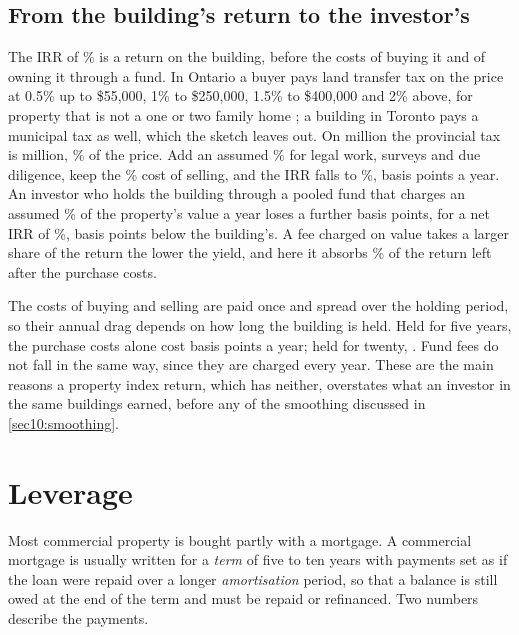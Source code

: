 \begin{chapterrefs}
\subsection{From the building's return to the investor's}
\label{sec10:frictions}

The IRR of \pfIrr\% is a return on the building, before the costs of buying it and of owning it through
a fund. In Ontario a buyer pays land transfer tax on the price at 0.5\% up to \$55,000, 1\% to
\$250,000, 1.5\% to \$400,000 and 2\% above, for property that is not a one or two family home
\parencite{ontarioltt}; a building in Toronto pays a municipal tax as well, which the sketch leaves out.
On \pfValue{} million the provincial tax is \frLtt{} million, \frLttShare\% of the price. Add an assumed
\frClosing\% for legal work, surveys and due diligence, keep the \pfSaleCost\% cost of selling, and the
IRR falls to \frIrrBuy\%, \frDragBuy{} basis points a year. An investor who holds the building through
a pooled fund that charges an assumed \frFee\% of the property's value a year loses a further
\frDragFee{} basis points, for a net IRR of \frIrrNet\%, \frDragAll{} basis points below the
building's. A fee charged on value takes a larger share of the return the lower the yield, and here it
absorbs \frFeeShare\% of the return left after the purchase costs.

The costs of buying and selling are paid once and spread over the holding period, so their annual
drag depends on how long the building is held. Held for five years, the purchase costs alone cost
\frDragBuyFive{} basis points a year; held for twenty, \frDragBuyTwenty. Fund fees do not fall in the
same way, since they are charged every year. These are the main reasons a property index return, which
has neither, overstates what an investor in the same buildings earned, before any of the smoothing
discussed in \cref{sec10:smoothing}.

\FloatBarrier
\section{Leverage}
\label{sec10:leverage}

Most commercial property is bought partly with a mortgage. A commercial mortgage is usually written for
a \emph{term} of five to ten years with payments set as if the loan were repaid over a longer
\emph{amortisation} period, so that a balance is still owed at the end of the term and must be repaid
or refinanced. Two numbers describe the payments.


\end{chapterrefs}

